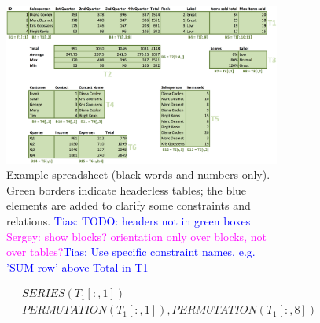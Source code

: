 \documentclass{IEEEtran}
\newcommand{\sergey}[1]{\textcolor{magenta}{{\sc Sergey:} #1}\xspace}
\newcommand{\tias}[1]{\textcolor{blue}{{\sc Tias:} #1}\xspace}
\newcommand{\range}[3]{\ensuremath{#1[#2,#3]}}
\newcommand{\rangeall}{:}
\newcommand{\ecperm}[1]{\ensuremath{\textit{PERMUTATION}(#1)}}
\newcommand{\ecseries}[1]{\ensuremath{\textit{SERIES}(#1)}}
\theoremstyle{definition}
\begin{document}

\begin{figure}[thb]

  \begin{subfigure}{.70\textwidth}
  \begin{center}
    \includegraphics[width=1\textwidth]{figures/Demo2.png}
  \end{center}
  \vspace{-10pt}
  \caption{Example spreadsheet (black words and numbers only). Green borders indicate headerless tables; the blue elements are added to clarify some constraints and relations. \tias{TODO: headers not in green boxes} \sergey{show blocks? orientation only over blocks, not over tables?}\tias{Use specific constraint names, e.g. 'SUM-row' above Total in T1}}
  \label{fig:main_example}
\end{subfigure}
\hfill
\begin{subfigure}{.30\textwidth}
  {\footnotesize
    \begin{align*}
      &~\ecseries{\range{T_{1}}{\rangeall}{1}} \\
%
      &~\ecperm{\range{T_{1}}{\rangeall}{1}}, \ecperm{\range{T_{1}}{\rangeall}{8}} \\

\end{align*}}
\end{subfigure}
\end{figure}
\end{document}
